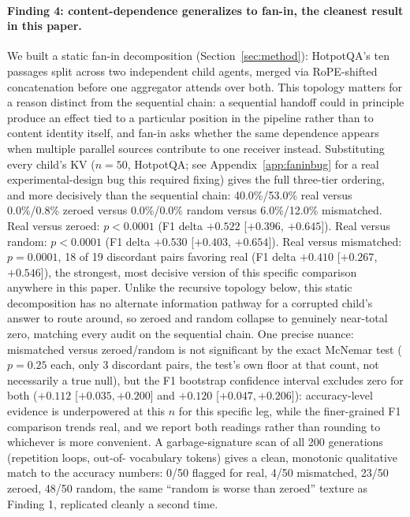 \documentclass[11pt]{article}
\begin{document}
\paragraph{Finding 4: content-dependence generalizes to fan-in, the
cleanest result in this paper.} We built a static fan-in decomposition
(Section~\ref{sec:method}): HotpotQA's ten passages split across two
independent child agents, merged via RoPE-shifted concatenation before
one aggregator attends over both. This topology matters for a reason
distinct from the sequential chain: a sequential handoff could in
principle produce an effect tied to a particular position in the
pipeline rather than to content identity itself, and fan-in asks whether
the same dependence appears when multiple parallel sources contribute to
one receiver instead. Substituting every child's KV ($n=50$, HotpotQA;
see Appendix~\ref{app:faninbug} for a real experimental-design bug this
required fixing) gives the full three-tier ordering, and more decisively
than the sequential chain: 40.0\%/53.0\% real versus 0.0\%/0.8\% zeroed
versus 0.0\%/0.0\% random versus 6.0\%/12.0\% mismatched. Real versus
zeroed: $p<0.0001$ (F1 delta $+0.522$ [$+0.396$, $+0.645$]). Real versus
random: $p<0.0001$ (F1 delta $+0.530$ [$+0.403$, $+0.654$]). Real versus
mismatched: $p=0.0001$, 18 of 19 discordant pairs favoring real (F1 delta
$+0.410$ [$+0.267$, $+0.546$]), the strongest, most decisive version of
this specific comparison anywhere in this paper. Unlike the recursive
topology below, this static decomposition has no alternate information
pathway for a corrupted child's answer to route around, so zeroed and
random collapse to genuinely near-total zero, matching every audit on
the sequential chain. One precise nuance: mismatched versus zeroed/random
is not significant by the exact McNemar test ($p=0.25$ each, only 3
discordant pairs, the test's own floor at that count, not necessarily a
true null), but the F1 bootstrap confidence interval excludes zero for
both ($+0.112$ [$+0.035,+0.200$] and $+0.120$ [$+0.047,+0.206$]):
accuracy-level evidence is underpowered at this $n$ for this specific
leg, while the finer-grained F1 comparison trends real, and we report
both readings rather than rounding to whichever is more convenient. A
garbage-signature scan of all 200 generations (repetition loops, out-of-
vocabulary tokens) gives a clean, monotonic qualitative match to the
accuracy numbers: 0/50 flagged for real, 4/50 mismatched, 23/50 zeroed,
48/50 random, the same ``random is worse than zeroed'' texture as
Finding 1, replicated cleanly a second time.
\end{document}
